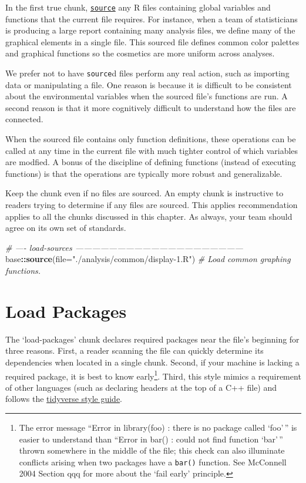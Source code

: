 \documentclass[]{book}
\newenvironment{Shaded}{\begin{snugshade}}{\end{snugshade}}
\newcommand{\CommentTok}[1]{\textcolor[rgb]{0.56,0.35,0.01}{\textit{#1}}}
\newcommand{\DataTypeTok}[1]{\textcolor[rgb]{0.13,0.29,0.53}{#1}}
\newcommand{\KeywordTok}[1]{\textcolor[rgb]{0.13,0.29,0.53}{\textbf{#1}}}
\newcommand{\NormalTok}[1]{#1}
\newcommand{\OperatorTok}[1]{\textcolor[rgb]{0.81,0.36,0.00}{\textbf{#1}}}
\newcommand{\StringTok}[1]{\textcolor[rgb]{0.31,0.60,0.02}{#1}}
\let\rmarkdownfootnote\footnote%
\def\footnote{\protect\rmarkdownfootnote}
\begin{document}
In the first true chunk, \href{https://stat.ethz.ch/R-manual/R-devel/library/base/html/source.html}{\texttt{source}} any R files containing global variables and functions that the current file requires. For instance, when a team of statisticians is producing a large report containing many analysis files, we define many of the graphical elements in a single file. This sourced file defines common color palettes and graphical functions so the cosmetics are more uniform across analyses.

We prefer not to have \texttt{source}d files perform any real action, such as importing data or manipulating a file. One reason is because it is difficult to be consistent about the environmental variables when the sourced file's functions are run. A second reason is that it more cognitively difficult to understand how the files are connected.

When the sourced file contains only function definitions, these operations can be called at any time in the current file with much tighter control of which variables are modfied. A bonus of the discipline of defining functions (instead of executing functions) is that the operations are typically more robust and generalizable.

Keep the chunk even if no files are sourced. An empty chunk is instructive to readers trying to determine if any files are sourced. This applies recommendation applies to all the chunks discussed in this chapter. As always, your team should agree on its own set of standards.

\begin{Shaded}
\begin{Highlighting}[]
\CommentTok{# ---- load-sources ------------------------------------------------------------}
\NormalTok{base}\OperatorTok{::}\KeywordTok{source}\NormalTok{(}\DataTypeTok{file=}\StringTok{"./analysis/common/display-1.R"}\NormalTok{)      }\CommentTok{# Load common graphing functions.}
\end{Highlighting}
\end{Shaded}

\hypertarget{load-packages}{%
\section{Load Packages}\label{load-packages}}

The `load-packages' chunk declares required packages near the file's beginning for three reasons. First, a reader scanning the file can quickly determine its dependencies when located in a single chunk. Second, if your machine is lacking a required package, it is best to know early\footnote{The error message ``Error in library(foo) : there is no package called `foo'\,'' is easier to understand than ``Error in bar() : could not find function `bar'\,'' thrown somewhere in the middle of the file; this check can also illuminate conflicts arising when two packages have a \texttt{bar()} function. See McConnell 2004 Section qqq for more about the `fail early' principle.}. Third, this style mimics a requirement of other languages (such as declaring headers at the top of a C++ file) and follows the \href{https://style.tidyverse.org/files.html\#internal-structure}{tidyverse style guide}.
\end{document}

